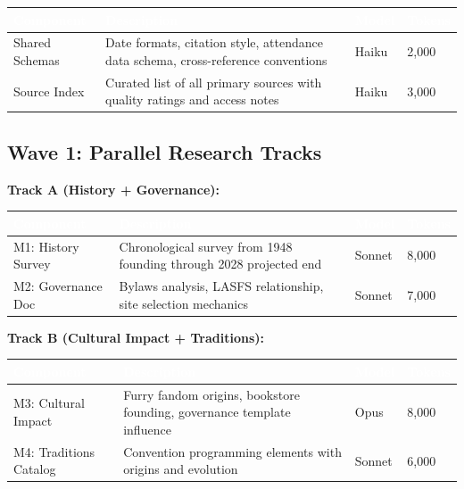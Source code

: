 \documentclass[11pt,letterpaper]{article}
\newcommand{\tableheader}[1]{\textbf{\sffamily\textcolor{white}{#1}}}
\begin{document}
\begin{center}
\begin{tabularx}{\textwidth}{L{3cm}XC{1.5cm}C{1.5cm}}
\toprule
{}
\tableheader{Component} & \tableheader{Description} & \tableheader{Model} & \tableheader{Tokens} \\
\midrule
Shared Schemas & Date formats, citation style, attendance data schema, cross-reference conventions & Haiku & 2,000 \\
Source Index & Curated list of all primary sources with quality ratings and access notes & Haiku & 3,000 \\
\bottomrule
\end{tabularx}
\end{center}

\subsection{Wave 1: Parallel Research Tracks}

\textbf{Track A (History + Governance):}

\begin{center}
\begin{tabularx}{\textwidth}{L{3cm}XC{1.5cm}C{1.5cm}}
\toprule
{}
\tableheader{Component} & \tableheader{Description} & \tableheader{Model} & \tableheader{Tokens} \\
\midrule
M1: History Survey & Chronological survey from 1948 founding through 2028 projected end & Sonnet & 8,000 \\
M2: Governance Doc & Bylaws analysis, LASFS relationship, site selection mechanics & Sonnet & 7,000 \\
\bottomrule
\end{tabularx}
\end{center}

\textbf{Track B (Cultural Impact + Traditions):}

\begin{center}
\begin{tabularx}{\textwidth}{L{3cm}XC{1.5cm}C{1.5cm}}
\toprule
{}
\tableheader{Component} & \tableheader{Description} & \tableheader{Model} & \tableheader{Tokens} \\
\midrule
M3: Cultural Impact & Furry fandom origins, bookstore founding, governance template influence & Opus & 8,000 \\
M4: Traditions Catalog & Convention programming elements with origins and evolution & Sonnet & 6,000 \\
\bottomrule
\end{tabularx}
\end{center}
\end{document}

